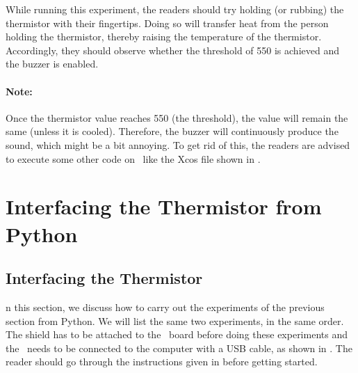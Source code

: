 \begin{enumerate}
        While running this experiment,
        the readers should try holding (or rubbing) the thermistor with their fingertips.
        Doing so will transfer heat from the person holding the
        thermistor, thereby raising the temperature of the thermistor.
        Accordingly, they should observe whether the threshold of 550 is achieved
        and the buzzer is enabled.

        \paragraph{Note:} Once the thermistor value reaches 550 (the threshold), the value will remain the same
        (unless it is cooled). Therefore, the buzzer will continuously produce the sound, which might be
        a bit annoying. To get rid of this, the readers are advised to
        execute some other code on \arduino\ like the Xcos file shown in
        .
\end{enumerate}


\section{Interfacing the Thermistor from Python}
\subsection{Interfacing the Thermistor}
n this section, we discuss how to carry out the experiments of the
previous section from Python.  We will list the same two experiments,
in the same order.  The shield has to be attached to the \arduino\ board
before doing these experiments and the \arduino\ needs to be connected to the computer
with a USB cable, as shown in .
The reader should go through the instructions given in
 before getting started.

